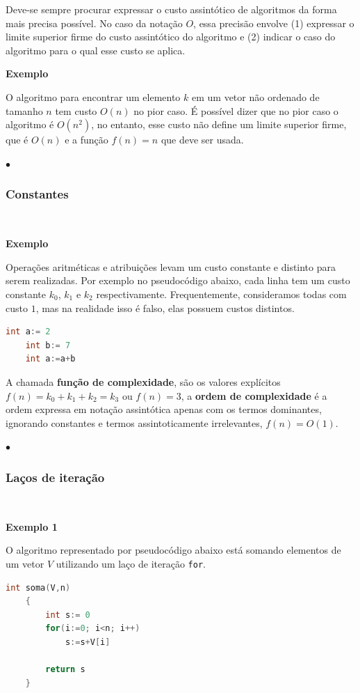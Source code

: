 Deve-se sempre procurar expressar o custo assintótico de algoritmos da forma mais precisa possível. No caso da notação $O$, essa precisão envolve (1) expressar o limite superior firme do custo assintótico do algoritmo e (2) indicar o caso do algoritmo para o qual esse custo se aplica.

\textbf{Exemplo}

O algoritmo para encontrar um elemento $k$ em um vetor não ordenado de tamanho $n$ tem custo $O(n)$ no pior caso. É possível dizer que no pior caso o algoritmo é $O(n^2)$, no entanto, esse custo não define um limite superior firme, que é $O(n)$ e a função $f(n)=n$ que deve ser usada.

{\raggedleft $\bullet$ \par}

\subsubsection{Constantes}
\

\textbf{Exemplo}

Operações aritméticas e atribuições levam um custo constante e distinto para serem realizadas. Por exemplo no pseudocódigo abaixo, cada linha tem um custo constante $k_0$, $k_1$ e $k_2$ respectivamente. Frequentemente, consideramos todas com custo $1$, mas na realidade isso é falso, elas possuem custos distintos.

\begin{lstlisting}[language=C, frame=single]
    int a:= 2
    int b:= 7
    int a:=a+b
\end{lstlisting}

A chamada \textbf{função de complexidade}, são os valores explícitos $f(n)=k_0+k_1+k_2=k_3$ ou $f(n)=3$, a \textbf{ordem de complexidade} é a ordem expressa em notação assintótica apenas com os termos dominantes, ignorando constantes e termos assintoticamente irrelevantes, $f(n)=O(1)$.

{\raggedleft $\bullet$ \par}

\subsubsection{Laços de iteração}
\

\textbf{Exemplo 1}

O algoritmo representado por pseudocódigo abaixo está somando elementos de um vetor $V$ utilizando um laço de iteração \texttt{for}.
\begin{lstlisting}[language=C, frame=single]
    int soma(V,n) 
    {
        int s:= 0
        for(i:=0; i<n; i++)
            s:=s+V[i]

        return s
    }
\end{lstlisting}

